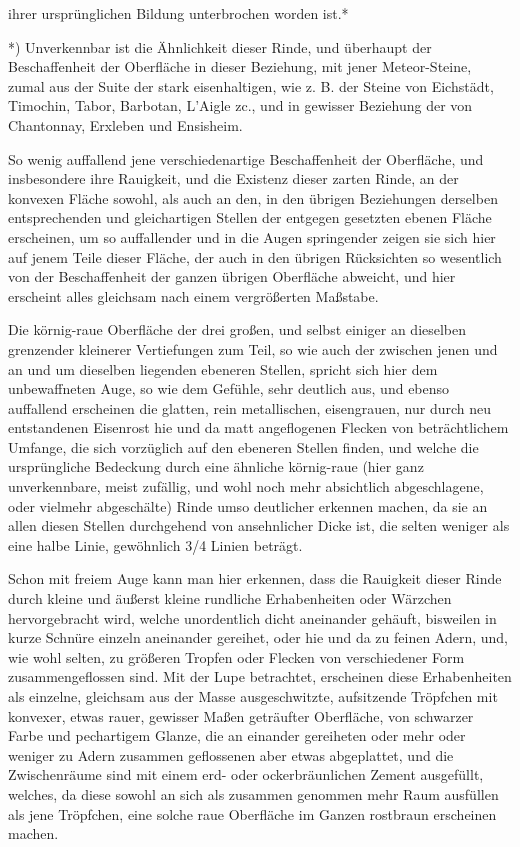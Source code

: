 \documentclass[a4paper, 11pt, oneside, german]{article}
\begin{document}
ihrer ursprünglichen Bildung unterbrochen worden ist.*

*) Unverkennbar ist die Ähnlichkeit dieser Rinde, und überhaupt der Beschaffenheit der Oberfläche in dieser Beziehung, mit jener Meteor-Steine, zumal aus der Suite der stark eisenhaltigen, wie z. B. der Steine von Eichstädt, Timochin, Tabor, Barbotan, L'Aigle zc., und in gewisser Beziehung der von Chantonnay, Erxleben und Ensisheim.

So wenig auffallend jene verschiedenartige Beschaffenheit der Oberfläche, und insbesondere ihre Rauigkeit, und die Existenz dieser zarten Rinde, an der konvexen Fläche sowohl, als auch an den, in den übrigen Beziehungen derselben entsprechenden und gleichartigen Stellen der entgegen gesetzten ebenen Fläche erscheinen, um so auffallender und in die Augen springender zeigen sie sich hier auf jenem Teile dieser Fläche, der auch in den übrigen Rücksichten so wesentlich von der Beschaffenheit der ganzen übrigen Oberfläche abweicht, und hier erscheint alles gleichsam nach einem vergrößerten Maßstabe.

Die körnig-raue Oberfläche der drei großen, und selbst einiger an dieselben grenzender kleinerer Vertiefungen zum Teil, so wie auch der zwischen jenen und an und um dieselben liegenden ebeneren Stellen, spricht sich hier dem unbewaffneten Auge, so wie dem Gefühle, sehr deutlich aus, und ebenso auffallend erscheinen die glatten, rein metallischen, eisengrauen, nur durch neu entstandenen Eisenrost hie und da matt angeflogenen Flecken von beträchtlichem Umfange, die sich vorzüglich auf den ebeneren Stellen finden, und welche die ursprüngliche Bedeckung durch eine ähnliche körnig-raue (hier ganz unverkennbare, meist zufällig, und wohl noch mehr absichtlich abgeschlagene, oder vielmehr abgeschälte) Rinde umso deutlicher erkennen machen, da sie an allen diesen Stellen durchgehend von ansehnlicher Dicke ist, die selten weniger als eine halbe Linie, gewöhnlich 3/4 Linien beträgt.

Schon mit freiem Auge kann man hier erkennen, dass die Rauigkeit dieser Rinde durch kleine und äußerst kleine rundliche Erhabenheiten oder Wärzchen hervorgebracht wird, welche unordentlich dicht aneinander gehäuft, bisweilen in kurze Schnüre einzeln aneinander gereihet, oder hie und da zu feinen Adern, und, wie wohl selten, zu größeren Tropfen oder Flecken von verschiedener Form zusammengeflossen sind. Mit der Lupe betrachtet, erscheinen diese Erhabenheiten als einzelne, gleichsam aus der Masse ausgeschwitzte, aufsitzende Tröpfchen mit konvexer, etwas rauer, gewisser Maßen geträufter Oberfläche, von schwarzer Farbe und pechartigem Glanze, die an einander gereiheten oder mehr oder weniger zu Adern zusammen geflossenen aber etwas abgeplattet, und die Zwischenräume sind mit einem erd- oder ockerbräunlichen Zement ausgefüllt, welches, da diese sowohl an sich als zusammen genommen mehr Raum ausfüllen als jene Tröpfchen, eine solche raue Oberfläche im Ganzen rostbraun erscheinen machen.
\end{document}
